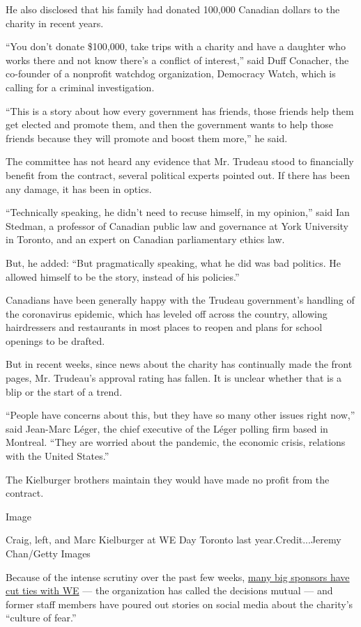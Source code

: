 He also disclosed that his family had donated 100,000 Canadian dollars
to the charity in recent years.

``You don't donate \$100,000, take trips with a charity and have a
daughter who works there and not know there's a conflict of interest,''
said Duff Conacher, the co-founder of a nonprofit watchdog organization,
Democracy Watch, which is calling for a criminal investigation.

``This is a story about how every government has friends, those friends
help them get elected and promote them, and then the government wants to
help those friends because they will promote and boost them more,'' he
said.

The committee has not heard any evidence that Mr. Trudeau stood to
financially benefit from the contract, several political experts pointed
out. If there has been any damage, it has been in optics.

``Technically speaking, he didn't need to recuse himself, in my
opinion,'' said Ian Stedman, a professor of Canadian public law and
governance at York University in Toronto, and an expert on Canadian
parliamentary ethics law.

But, he added: ``But pragmatically speaking, what he did was bad
politics. He allowed himself to be the story, instead of his policies.''

Canadians have been generally happy with the Trudeau government's
handling of the coronavirus epidemic, which has leveled off across the
country, allowing hairdressers and restaurants in most places to reopen
and plans for school openings to be drafted.

But in recent weeks, since news about the charity has continually made
the front pages, Mr. Trudeau's approval rating has fallen. It is unclear
whether that is a blip or the start of a trend.

``People have concerns about this, but they have so many other issues
right now,'' said Jean-Marc Léger, the chief executive of the Léger
polling firm based in Montreal. ``They are worried about the pandemic,
the economic crisis, relations with the United States.''

The Kielburger brothers maintain they would have made no profit from the
contract.

Image

Craig, left, and Marc Kielburger at WE Day Toronto last
year.Credit...Jeremy Chan/Getty Images

Because of the intense scrutiny over the past few weeks,
\href{https://www.theglobeandmail.com/world/article-royal-bank-cuts-ties-with-embattled-we-charity/}{many
big sponsors have cut ties with WE} --- the organization has called the
decisions mutual --- and former staff members have poured out stories on
social media about the charity's ``culture of fear.''

